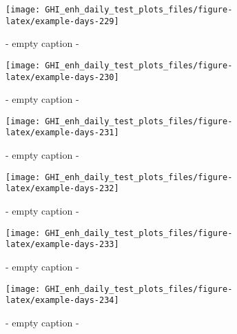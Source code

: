 \documentclass[
  10pt,
  a4paper,oneside]{article}
\begin{document}
\begin{figure}[H]

{\centering \texttt{[image: GHI\_enh\_daily\_test\_plots\_files/figure-latex/example-days-229]} 

}

\caption{ - empty caption - }\label{fig:example-days-229}
\end{figure}

\begin{figure}[H]

{\centering \texttt{[image: GHI\_enh\_daily\_test\_plots\_files/figure-latex/example-days-230]} 

}

\caption{ - empty caption - }\label{fig:example-days-230}
\end{figure}

\begin{figure}[H]

{\centering \texttt{[image: GHI\_enh\_daily\_test\_plots\_files/figure-latex/example-days-231]} 

}

\caption{ - empty caption - }\label{fig:example-days-231}
\end{figure}

\begin{figure}[H]

{\centering \texttt{[image: GHI\_enh\_daily\_test\_plots\_files/figure-latex/example-days-232]} 

}

\caption{ - empty caption - }\label{fig:example-days-232}
\end{figure}

\begin{figure}[H]

{\centering \texttt{[image: GHI\_enh\_daily\_test\_plots\_files/figure-latex/example-days-233]} 

}

\caption{ - empty caption - }\label{fig:example-days-233}
\end{figure}

\begin{figure}[H]

{\centering \texttt{[image: GHI\_enh\_daily\_test\_plots\_files/figure-latex/example-days-234]} 

}

\caption{ - empty caption - }\label{fig:example-days-234}
\end{figure}
\end{document}
